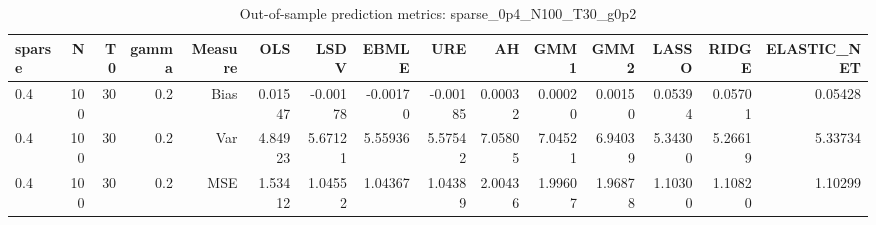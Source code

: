 \begin{table}[!htbp]\centering
\caption{Out-of-sample prediction metrics: sparse_0p4_N100_T30_g0p2}
\label{tab:table3_sparse_0p4_N100_T30_g0p2}
\begin{tabular}{lrrrrrrrrrrrrrr}
\hline
sparse & N & T0 & gamma & Measure & OLS & LSDV & EBMLE & URE & AH & GMM1 & GMM2 & LASSO & RIDGE & ELASTIC_NET \\
\hline
0.4 & 100 & 30 & 0.2 & Bias & 0.01547 & -0.00178 & -0.00170 & -0.00185 & 0.00032 & 0.00020 & 0.00150 & 0.05394 & 0.05701 & 0.05428 \\
0.4 & 100 & 30 & 0.2 & Var & 4.84923 & 5.67121 & 5.55936 & 5.57542 & 7.05805 & 7.04521 & 6.94039 & 5.34300 & 5.26619 & 5.33734 \\
0.4 & 100 & 30 & 0.2 & MSE & 1.53412 & 1.04552 & 1.04367 & 1.04389 & 2.00436 & 1.99607 & 1.96878 & 1.10300 & 1.10820 & 1.10299 \\
\hline
\end{tabular}
\end{table}

